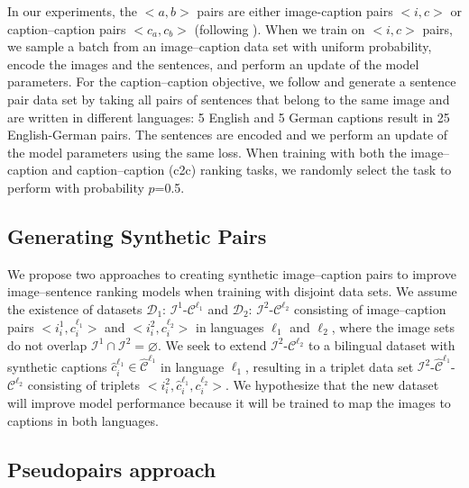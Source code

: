 In our experiments, the $<a, b>$ pairs are either image-caption pairs 
$<i, c>$ or caption--caption pairs $<c_a, c_b>$ (following \cite{gella2017image,kadar2018conll}).
When we train on $<i, c>$ pairs, we sample a batch
from an image--caption data set with uniform probability, encode the images and the sentences, and perform an update of the model parameters.
For the caption--caption objective, 
we follow \cite{kadar2018conll} and 
generate a sentence pair data set
by taking all pairs of sentences 
that belong to the same image
and are written in different languages: 5 English
and 5 German captions result in 25 English-German 
pairs. 
The sentences are encoded and we perform an update of 
the model parameters using the same loss. 
When training with both the image--caption and 
caption--caption (c2c) ranking tasks, 
we randomly select the task to perform with 
probability $p$=0.5. 

\subsection{Generating Synthetic Pairs}\label{sec:method:synthetic}

We propose two approaches to creating synthetic image--caption pairs to improve image--sentence ranking models when training with disjoint data sets. We assume the existence of datasets 
$\mathcal{D}_1$: $\mathcal{I}^1$-$\mathcal{C}^{\ell_1}$ and
$\mathcal{D}_2$: $\mathcal{I}^2$-$\mathcal{C}^{\ell_2}$
consisting of image--caption pairs $<i^1_i, c^{\ell_1}_i>$ and 
$<i^2_i, c^{\ell_2}_i>$ in 
languages $\ell_1$ and $\ell_2$, where the image sets do not overlap 
$\mathcal{I}^1 \cap \mathcal{I}^2 = \varnothing$. 
We seek to extend $\mathcal{I}^2$-$\mathcal{C}^{\ell_2}$ 
to a bilingual dataset with synthetic captions
$\hat{c}^{\ell_1}_i \in \hat{\mathcal{C}}^{\ell_1}$ 
in language $\ell_1$, resulting in a triplet data set 
$\mathcal{I}^2$-$\hat{\mathcal{C}}^{\ell_1}$-$\mathcal{C}^{\ell_2}$ 
consisting of triplets
 $<i^2_i, \hat{c}^{\ell_1}_i, c^{\ell_2}_i>$.
 We hypothesize that the new dataset will improve model performance because it will be trained to map the images to captions in both languages.%
 

\subsection{Pseudopairs approach}\label{sec:method:pseudo}

